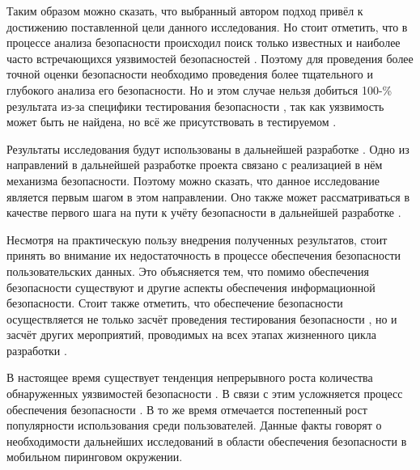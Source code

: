 %
Таким образом можно сказать, что выбранный автором подход привёл к достижению поставленной цели данного исследования. 
%
Но стоит отметить, что в процессе анализа безопасности  происходил поиск только известных и наиболее часто встречающихся уязвимостей безопасностей . 
%
Поэтому для проведения более точной оценки безопасности  необходимо проведения более тщательного и глубокого анализа его безопасности. 
%
Но и этом случае нельзя добиться 100-\% результата из-за специфики тестирования безопасности , так как уязвимость может быть не найдена, но всё же присутствовать в тестируемом . 



%
Результаты исследования будут использованы в дальнейшей разработке . 
%
Одно из направлений в дальнейшей разработке проекта связано с реализацией в нём механизма безопасности.
%
Поэтому можно сказать, что данное исследование является первым шагом в этом направлении. 
%
Оно также может рассматриваться в качестве первого шага на пути к учёту безопасности в дальнейшей разработке .

%
Несмотря на практическую пользу внедрения полученных результатов, стоит принять во внимание их недостаточность в процессе обеспечения безопасности пользовательских данных. 
%
Это объясняется тем, что помимо обеспечения безопасности  существуют и другие аспекты обеспечения информационной безопасности. 
%
Стоит также отметить, что обеспечение безопасности  осуществляется не только засчёт проведения тестирования безопасности , но и засчёт других мероприятий, проводимых на всех этапах жизненного цикла разработки . 

%
В настоящее время существует тенденция непрерывного роста количества обнаруженных уязвимостей безопасности . 
%
В связи с этим усложняется процесс обеспечения безопасности . 
%
В то же время отмечается постепенный рост популярности использования  среди пользователей. 
%
Данные факты говорят о необходимости дальнейших исследований в области обеспечения безопасности  в мобильном пиринговом окружении. 
